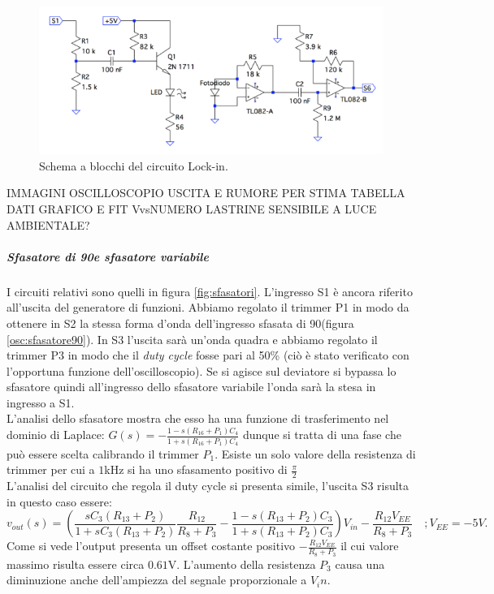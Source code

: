 \documentclass[10pt,a4paper]{article}
\begin{document}
\begin{figure}[!htb]
  \centering
  \includegraphics[scale=0.75]{ampli-preampli.png}
\caption{Schema a blocchi del circuito Lock-in.\label{fig:ampli-preampli}}
\end{figure}

IMMAGINI OSCILLOSCOPIO USCITA E RUMORE PER STIMA
TABELLA DATI
GRAFICO E FIT VvsNUMERO LASTRINE
SENSIBILE A LUCE AMBIENTALE?

\subparagraph{Sfasatore di 90\degree e sfasatore variabile}
I circuiti relativi sono quelli in figura \ref{fig:sfasatori}. L'ingresso S1 è ancora riferito all'uscita del generatore di funzioni. Abbiamo regolato il trimmer P1 in modo da ottenere in S2 la stessa forma d'onda dell'ingresso sfasata di 90\degree (figura \ref{osc:sfasatore90}). In S3 l'uscita sarà un'onda quadra e abbiamo regolato il trimmer P3 in modo che il \emph{duty cycle} fosse pari al 50\% (ciò è stato verificato con l'opportuna funzione dell'oscilloscopio). Se si agisce sul deviatore si bypassa lo sfasatore quindi all'ingresso dello sfasatore variabile l'onda sarà la stesa in ingresso a S1.\\
L'analisi dello sfasatore mostra che esso ha una funzione di trasferimento nel dominio di Laplace: $G(s) = -\frac{1-s(R_{16} +P_1) C_{4}}{1+s(R_{16} + P_1)C_{4}}$ dunque si tratta di una fase che può essere scelta calibrando il trimmer $P_1$. Esiste un solo valore della resistenza di trimmer per cui a $1$kHz si ha uno sfasamento positivo di $\frac{\pi}{2}$\\
L'analisi del circuito che regola il duty cycle si presenta simile, l'uscita S3 risulta in questo caso essere:
\begin{equation}
v_{out}(s) = \left( \frac{s C_3 (R_{13} + P_2)}{1 + s C_3 (R_{13} + P_2)} \frac{R_{12}}{R_8+P_3} -\frac{1-s(R_{13} +P_2) C_{3}}{1+s(R_{13} + P_2)C_{3}} \right) V_{in}-\frac{R_{12} V_{EE}}{R_8+P_3}
\, \, \, \, \, \, ; V_{EE} = -5V.
\end{equation}
Come si vede l'output presenta un offset costante positivo $-\frac{R_{12} V_{EE}}{R_8+P_3}$ il cui valore massimo risulta essere circa $0.61$V. L'aumento della resistenza $P_3$ causa una diminuzione anche dell'ampiezza del segnale proporzionale a $V_in$. 
\end{document}
